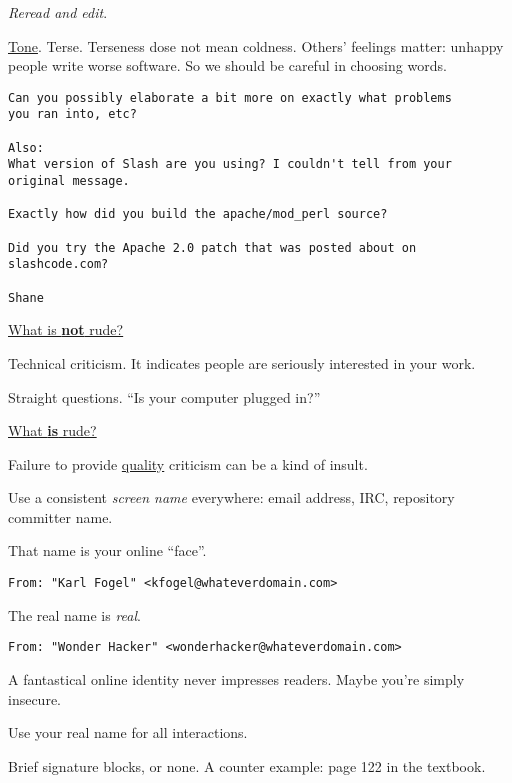 \documentclass[landscape,30pt]{foils}
\begin{document}
{\em Reread and edit}.

\underline{Tone}. Terse.   Terseness dose not mean coldness.  Others' feelings matter: unhappy people write worse software.  So we should be careful in choosing words.

\begin{verbatim}
Can you possibly elaborate a bit more on exactly what problems
you ran into, etc?

Also:
What version of Slash are you using? I couldn't tell from your
original message.

Exactly how did you build the apache/mod_perl source?

Did you try the Apache 2.0 patch that was posted about on
slashcode.com?

Shane
\end{verbatim}


\underline{What is {\bf not} rude?}

Technical criticism. It indicates people are seriously interested in your work.

Straight questions.  ``Is your computer plugged in?''

\underline{What {\bf is} rude?}

Failure to provide \underline{quality} criticism can be a kind of insult.


Use a consistent {\em screen name} everywhere: email address, IRC, repository committer name.

That name is your online ``face''.

\begin{verbatim}
From: "Karl Fogel" <kfogel@whateverdomain.com>
\end{verbatim}

The real name is {\em real}.

\begin{verbatim}
From: "Wonder Hacker" <wonderhacker@whateverdomain.com>
\end{verbatim}

A fantastical online identity never impresses readers.   Maybe you're simply insecure.

Use your real name for all interactions.

Brief signature blocks, or none.  A counter example: page 122 in the textbook.
\end{document}
